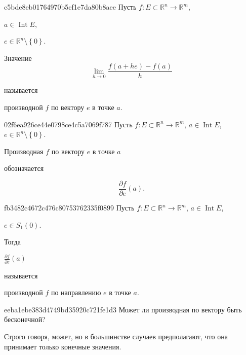 \begin{note}{c5bde8eb01764970b5cf1e7da80b8aee}
    Пусть \({ f : E \subset \mathbb R^{n} \to \mathbb R^{m} }\), \begin{icloze}{4}\({ a \in \operatorname{Int} E }\),\end{icloze}\: \begin{icloze}{3}\({ e \in \mathbb R^{n} \setminus \left\{ 0 \right\} }\).\end{icloze}
    \begin{icloze}{1}
        Значение
        \[
            \lim_{h \to 0} \frac{f(a + he) - f(a)}{h}
        \]
    \end{icloze}
    называется \begin{icloze}{2}производной \({ f }\) по вектору \({ e }\) в точке \({ a }\).\end{icloze}
\end{note}

\begin{note}{02f6ea926ce44e0798ce4c5a7069f787}
    Пусть \({ f : E \subset \mathbb R^{n} \to \mathbb R^{m} }\), \({ a \in \operatorname{Int} E }\),\: \({ e \in \mathbb R^{n} \setminus \left\{ 0 \right\} }\).
    \begin{icloze}{2}Производная \({ f }\) по вектору \({ e }\) в точке \({ a }\)\end{icloze} обозначается
    \begin{icloze}{1}
        \[
            \frac{\partial f}{\partial e}(a).
        \]
    \end{icloze}
\end{note}

\begin{note}{fb3482c4672c476c80753762335f0899}
    Пусть \({ f : E \subset \mathbb R^{n} \to \mathbb R^{m} }\), \({ a \in \operatorname{Int} E }\),\: \begin{icloze}{3}\({ e \in S_1(0) }\).\end{icloze}
    Тогда \begin{icloze}{2}\({ \frac{\partial f}{\partial e}(a) }\)\end{icloze} называется \begin{icloze}{1}производной \({ f }\) по направлению \({ e }\) в точке \({ a }\).\end{icloze}
\end{note}

\begin{note}{eeba1ebe383d4749bd35920c721fe1d3}
    Может ли производная по вектору быть бесконечной?

    \begin{cloze}{1}
        Строго говоря, может, но в большинстве случаев предполагают, что она принимает только конечные значения.
    \end{cloze}
\end{note}

